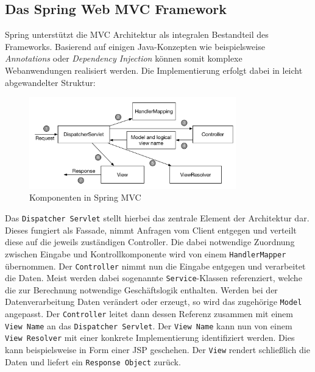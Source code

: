 \subsection{Das Spring Web MVC Framework}
Spring unterstützt die \acs{MVC} Architektur als integralen Bestandteil des Frameworks. Basierend auf einigen Java-Konzepten wie beispielsweise \textit{Annotations} oder \textit{Dependency Injection} können somit komplexe Webanwendungen realisiert werden. Die Implementierung erfolgt dabei in leicht abgewandelter Struktur: \\
\begin{figure}[bth] 
  \centering
  \includegraphics[width=0.8\textwidth]{Graphics/spring_mvc}
  \caption{Komponenten in Spring MVC}
\end{figure}
\newpage
Das \texttt{Dispatcher Servlet} stellt hierbei das zentrale Element der Architektur dar. Dieses fungiert als Fassade, nimmt Anfragen vom Client entgegen und verteilt diese auf die jeweils zuständigen Controller. Die dabei notwendige Zuordnung zwischen Eingabe und Kontrollkomponente wird von einem \texttt{HandlerMapper} übernommen. Der \texttt{Controller} nimmt nun die Eingabe entgegen und verarbeitet die Daten. Meist werden dabei sogenannte \texttt{Service}-Klassen referenziert, welche die zur Berechnung notwendige Geschäftslogik enthalten. Werden bei der Datenverarbeitung Daten verändert oder erzeugt, so wird das zugehörige \texttt{Model} angepasst. Der \texttt{Controller} leitet dann dessen Referenz zusammen mit einem \texttt{View Name} an das \texttt{Dispatcher Servlet}. Der \texttt{View Name} kann nun von einem \texttt{View Resolver} mit einer konkrete Implementierung identifiziert werden. Dies kann beispielsweise in Form einer \acs{JSP} geschehen. Der \texttt{View} rendert schließlich die Daten und liefert ein \texttt{Response Object} zurück.\\\\


